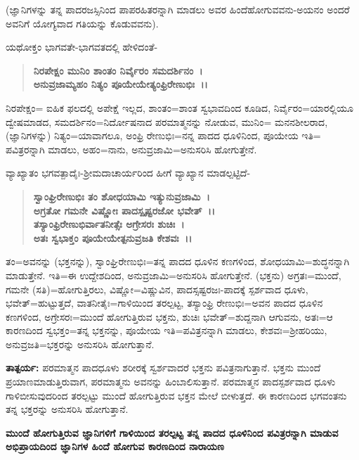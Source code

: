 (ಜ್ಞಾನಿಗಳನ್ನು ತನ್ನ ಪಾದರಜಸ್ಸಿನಿಂದ ಪಾಪರಹಿತರನ್ನಾಗಿ ಮಾಡಲು ಅವರ ಹಿಂದೆ\break ಹೋಗುವವನು-ಅಯನಂ ಅಂದರೆ ಅವನಿಗೆ ಯೋಗ್ಯವಾದ ಗತಿಯನ್ನು ಕೊಡುವವನು).

ಯಥೋಕ್ತಂ ಭಾಗವತೇ-ಭಾಗವತದಲ್ಲಿ ಹೇಳಿದಂತೆ-

\begin{verse}
\textbf{ನಿರಪೇಕ್ಷಂ ಮುನಿಂ ಶಾಂತಂ ನಿರ್ವೈರಂ ಸಮದರ್ಶಿನಂ~।}\\\textbf{ಅನುವ್ರಜಾಮ್ಯಹಂ ನಿತ್ಯಂ ಪೂಯೇಯೇತ್ಯಂಫ್ರಿರೇಣುಭಿಃ~।।}
\end{verse}

ನಿರಪೇಕ್ಷಂ= ಐಹಿಕ ಫಲದಲ್ಲಿ ಅಪೇಕ್ಷೆ ಇಲ್ಲದ, ಶಾಂತಂ=ಶಾಂತ ಸ್ವಭಾವದಿಂದ ಕೂಡಿದ, ನಿರ್ವೈರಂ=ಯಾರಲ್ಲಿಯೂ ದ್ವೇಷಮಾಡದ, ಸಮದರ್ಶಿನಂ=ನಿರ್ದೋಷನಾದ ಪರಮಾತ್ಮ\-ನನ್ನು ನೋಡುವ, ಮುನಿಂ= ಮನನಶೀಲರಾದ, (ಜ್ಞಾನಿಗಳನ್ನು) ನಿತ್ಯಂ=ಯಾವಾಗಲೂ, ಅಂಫ್ರಿ ರೇಣುಭಿಃ=ನನ್ನ ಪಾದದ ಧೂಳಿನಿಂದ, ಪೂಯೇಯ ಇತಿ= ಪವಿತ್ರರನ್ನಾಗಿ ಮಾಡಲು, ಅಹಂ=ನಾನು, ಅನುವ್ರಜಾಮಿ=ಅನುಸರಿಸಿ ಹೋಗುತ್ತೇನೆ.

ವ್ಯಾಖ್ಯಾತಂ ಭಗವತ್ಪಾದೈಃ-ಶ‍್ರೀಮದಾಚಾರ್ಯರಿಂದ ಹೀಗೆ ವ್ಯಾಖ್ಯಾನ ಮಾಡಲ್ಪ\-ಟ್ಟಿದೆ-

\begin{verse}
\textbf{ಸ್ವಾಂಘ್ರಿರೇಣುಭಿಃ ತಂ ಶೋಧಯಾಮಿ ಇತ್ಯುನುವ್ರಜಾಮಿ~।}\\\textbf{ಅಗ್ರತೋ ಗಮನೇ ವಿಷ್ಣೋಃ ಪಾದಸ್ಪೃಷ್ಟರಜೋ ಭವೇತ್~।।}\\\textbf{ತಸ್ಯಾಂಫ್ರಿರೇಣುಭಿರ್ವಾತನೀತ್ಸೆಃ ಅಗ್ರೇಸರಃ ಶುಚಿಃ~।}\\\textbf{ಅತಃ ಸ್ವಭಾಕ್ತಂ ಪೂಯೇಯೇತ್ಪನುವ್ರಜತಿ ಕೇಶವಃ~।।}
\end{verse}

ತಂ=ಅವನನ್ನು (ಭಕ್ತನನ್ನು), ಸ್ವಾಂಘ್ರಿರೇಣುಭಿಃ=ತನ್ನ ಪಾದದ ಧೂಳಿನ ಕಣಗಳಿಂದ, ಶೋಧಯಾಮಿ=ಶುದ್ಧನನ್ನಾಗಿ ಮಾಡುತ್ತೇನೆ. ಇತಿ=ಈ ಉದ್ದೇಶದಿಂದ, ಅನು\-ವ್ರಜಾಮಿ=\break ಅನುಸರಿಸಿ ಹೋಗುತ್ತೇನೆ. (ಭಕ್ತನು) ಅಗ್ರತಃ=ಮುಂದೆ, ಗಮನೇ (ಸತಿ)=ಹೋಗುತ್ತಿರಲು, ವಿಷ್ಣೋ=ವಿಷ್ಣುವಿನ, ಪಾದಸ್ಸಷ್ಟರಜಃ-ಪಾದಕ್ಕೆ ಸ್ಪರ್ಶವಾದ ಧೂಳು, ಭವೇತ್=ಹುಟ್ಟುತ್ತದೆ, ವಾತನೀತೈಃ=ಗಾಳಿಯಿಂದ ತರಲ್ಪಟ್ಟ, ತಸ್ಯಾಂಫ್ರಿ ರೇಣುಭಿಃ=ಅವನ ಪಾದದ ಧೂಳಿನ ಕಣಗಳಿಂದ, ಅಗ್ರೇಸರಃ=ಮುಂದೆ ಹೋಗುತ್ತಿರುವ ಭಕ್ತನು, ಶುಚಿಃ ಭವೇತ್=ಶುದ್ದನಾಗಿ ಆಗುವನು, ಅತಃ=ಆ ಕಾರಣದಿಂದ ಸ್ವಭಕ್ತಂ=ತನ್ನ ಭಕ್ತನನ್ನು, ಪೂಯೇಯ ಇತಿ=ಪವಿತ್ರನನ್ನಾಗಿ ಮಾಡಲು, ಕೇಶವಃ=ಶ‍್ರೀಹರಿಯು, ಅನುವ್ರಜತಿ=ಭಕ್ತರನ್ನು ಅನುಸರಿಸಿ ಹೋಗುತ್ತಾನೆ.

\textbf{ತಾತ್ಪರ್ಯ:} ಪರಮಾತ್ಮನ ಪಾದಧೂಳು ಶರೀರಕ್ಕೆ ಸ್ವರ್ಶವಾದರೆ ಭಕ್ತನು ಪವಿತ್ರನಾಗುತ್ತಾನೆ. ಭಕ್ತನು ಮುಂದೆ ಪ್ರಯಾಣಮಾಡುತ್ತಿರುವಾಗ, ಪರಮಾತ್ಮನು ಅವನನ್ನು ಹಿಂಬಾಲಿಸುತ್ತಾನೆ. ಪರಮಾತ್ಮನ ಪಾದಸ್ಪರ್ಶವಾದ ಧೂಳು ಗಾಳಿಬೀಸುವುದರಿಂದ ತರಲ್ಪಟ್ಟು ಮುಂದೆ ಹೋಗುತ್ತಿರುವ ಭಕ್ತನ ಮೇಲೆ ಬೀಳುತ್ತದೆ. ಈ ಕಾರಣದಿಂದ ಭಗವಂತನು ತನ್ನ ಭಕ್ತರನ್ನು ಅನುಸರಿಸಿ ಹೋಗುತ್ತಾನೆ.

\begin{center}
\textbf{ಮುಂದೆ ಹೋಗುತ್ತಿರುವ ಜ್ಞಾನಿಗಳಿಗೆ ಗಾಳಿಯಿಂದ ತರಲ್ಪಟ್ಟ ತನ್ನ ಪಾದದ ಧೂಳಿನಿಂದ ಪವಿತ್ರರನ್ನಾಗಿ ಮಾಡುವ ಅಭಿಪ್ರಾಯದಿಂದ ಜ್ಞಾನಿಗಳ ಹಿಂದೆ ಹೋಗುವ ಕಾರಣದಿಂದ ನಾರಾಯಣ}
\end{center}

